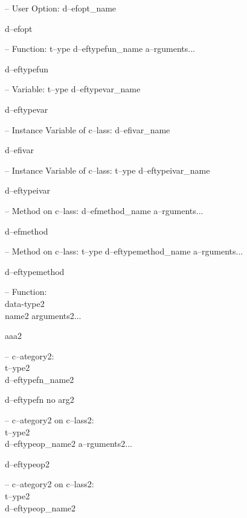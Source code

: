 \documentclass{book}
\begin{document}
\hbox{}-- User Option: d--efopt\_name


%
d--efopt

\hbox{}-- Function: t--ype d--eftypefun\_name a--rguments...


%
d--eftypefun

\hbox{}-- Variable: t--ype d--eftypevar\_name


%
d--eftypevar

\hbox{}-- Instance Variable of c--lass: d--efivar\_name


%
d--efivar

\hbox{}-- Instance Variable of c--lass: t--ype d--eftypeivar\_name


%
d--eftypeivar

\hbox{}-- Method on c--lass: d--efmethod\_name a--rguments...


%
d--efmethod

\hbox{}-- Method on c--lass: t--ype d--eftypemethod\_name a--rguments...


%
d--eftypemethod


\hbox{}-- Function:\leavevmode{}\\data-type2\leavevmode{}\\name2 arguments2...


%
aaa2

\hbox{}-- c--ategory2:\leavevmode{}\\t--ype2\leavevmode{}\\d--eftypefn\_name2


%
d--eftypefn no arg2

\hbox{}-- c--ategory2 on c--lass2:\leavevmode{}\\t--ype2\leavevmode{}\\d--eftypeop\_name2 a--rguments2...


%
d--eftypeop2

\hbox{}-- c--ategory2 on c--lass2:\leavevmode{}\\t--ype2\leavevmode{}\\d--eftypeop\_name2
\end{document}
